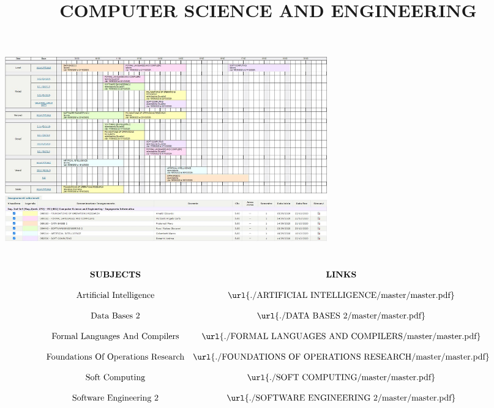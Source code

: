 \documentclass[a4paper, 9pt]{article}
\title{COMPUTER SCIENCE AND ENGINEERING}
\begin{document}
    \maketitle
    \begin{center}
        \includegraphics[height=8cm]{./primoanno-primosemestre-orariopolimi.JPG}
    \end{center}
    \ \newline
    \newline
    \[
        \begin{matrix}
            \text{\textbf{SUBJECTS}} & \text{\textbf{LINKS}} \\
            \\
            \text{Artificial Intelligence}& \text{\url{./ARTIFICIAL INTELLIGENCE/master/master.pdf}}\\
            \\
            \text{Data Bases 2}& \text{\url{./DATA BASES 2/master/master.pdf}}\\
            \\
            \text{Formal Languages And Compilers}& \text{\url{./FORMAL LANGUAGES AND COMPILERS/master/master.pdf}}\\
            \\
            \text{Foundations Of Operations Research}& \text{\url{./FOUNDATIONS OF OPERATIONS RESEARCH/master/master.pdf}}\\
            \\
            \text{Soft Computing}& \text{\url{./SOFT COMPUTING/master/master.pdf}}\\
            \\
            \text{Software Engineering 2}& \text{\url{./SOFTWARE ENGINEERING 2/master/master.pdf}}\\
        \end{matrix}
    \]
\end{document}
